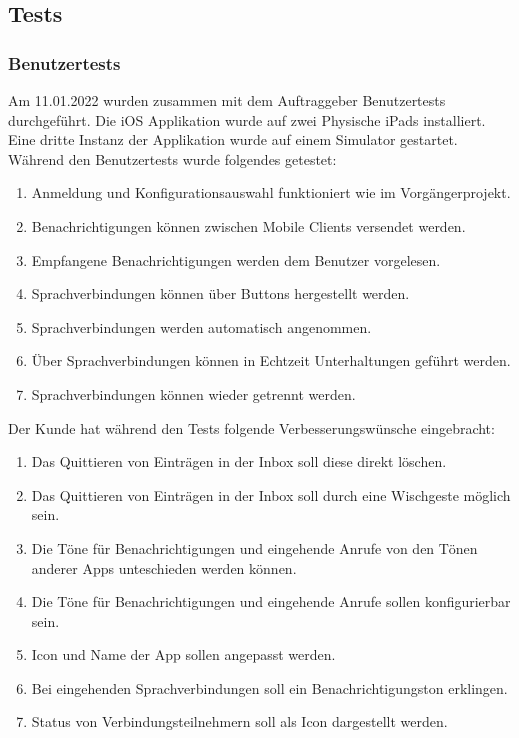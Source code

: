 \subsection{Tests}

\subsubsection{Benutzertests}

Am 11.01.2022 wurden zusammen mit dem Auftraggeber Benutzertests durchgeführt.
Die iOS Applikation wurde auf zwei Physische iPads installiert.
Eine dritte Instanz der Applikation wurde auf einem Simulator gestartet.
Während den Benutzertests wurde folgendes getestet:

\begin{enumerate}
    \item Anmeldung und Konfigurationsauswahl funktioniert wie im Vorgängerprojekt.
    \item Benachrichtigungen können zwischen Mobile Clients versendet werden.
    \item Empfangene Benachrichtigungen werden dem Benutzer vorgelesen.
    \item Sprachverbindungen können über Buttons hergestellt werden.
    \item Sprachverbindungen werden automatisch angenommen.
    \item Über Sprachverbindungen können in Echtzeit Unterhaltungen geführt werden.
    \item Sprachverbindungen können wieder getrennt werden.
\end{enumerate}

Der Kunde hat während den Tests folgende Verbesserungswünsche eingebracht:

\begin{enumerate}
    \item Das Quittieren von Einträgen in der Inbox soll diese direkt löschen.
    \item Das Quittieren von Einträgen in der Inbox soll durch eine Wischgeste möglich sein.
    \item Die Töne für Benachrichtigungen und eingehende Anrufe von den Tönen anderer Apps unteschieden werden können.
    \item Die Töne für Benachrichtigungen und eingehende Anrufe sollen konfigurierbar sein.
    \item Icon und Name der App sollen angepasst werden.
    \item Bei eingehenden Sprachverbindungen soll ein Benachrichtigungston erklingen.
    \item Status von Verbindungsteilnehmern soll als Icon dargestellt werden.
\end{enumerate}

